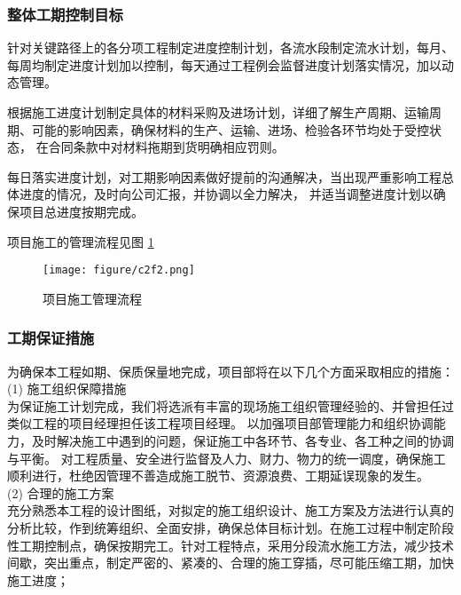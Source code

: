 \subsubsection{整体工期控制目标}

\setlength{\baselineskip}{20pt}
针对关键路径上的各分项工程制定进度控制计划，各流水段制定流水计划，每月、每周均制定进度计划加以控制，每天通过工程例会监督进度计划落实情况，加以动态管理。 

根据施工进度计划制定具体的材料采购及进场计划，详细了解生产周期、运输周期、可能的影响因素，确保材料的生产、运输、进场、检验各环节均处于受控状态，
在合同条款中对材料拖期到货明确相应罚则。

每日落实进度计划，对工期影响因素做好提前的沟通解决，当出现严重影响工程总体进度的情况，及时向公司汇报，并协调以全力解决，
并适当调整进度计划以确保项目总进度按期完成。

项目施工的管理流程见图 \ref{fig:c2f2}

\begin{figure}[thbp!]
    \centering
    \texttt{[image: figure/c2f2.png]}
    \caption{项目施工管理流程}
    \label{fig:c2f2}
\end{figure}

\clearpage
\subsubsection{工期保证措施}

为确保本工程如期、保质保量地完成，项目部将在以下几个方面采取相应的措施：\\

(1) 施工组织保障措施\\

为保证施工计划完成，我们将选派有丰富的现场施工组织管理经验的、并曾担任过类似工程的项目经理担任该工程项目经理。
以加强项目部管理能力和组织协调能力，及时解决施工中遇到的问题，保证施工中各环节、各专业、各工种之间的协调与平衡。
对工程质量、安全进行监督及人力、财力、物力的统一调度，确保施工顺利进行，杜绝因管理不善造成施工脱节、资源浪费、工期延误现象的发生。\\

(2) 合理的施工方案\\

 充分熟悉本工程的设计图纸，对拟定的施工组织设计、施工方案及方法进行认真的分析比较，作到统筹组织、全面安排，确保总体目标计划。在施工过程中制定阶段性工期控制点，确保按期完工。针对工程特点，采用分段流水施工方法，减少技术间歇，突出重点，制定严密的、紧凑的、合理的施工穿插，尽可能压缩工期，加快施工进度；

